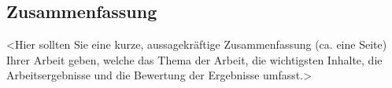 %
\pagestyle{empty}

\subsection*{Zusammenfassung}

<Hier sollten Sie eine kurze, aussagekräftige Zusammenfassung (ca. eine Seite) Ihrer Arbeit geben, welche das Thema der Arbeit, die wichtigsten Inhalte, die Arbeitsergebnisse und die Bewertung der Ergebnisse umfasst.> 

\cleardoublepage